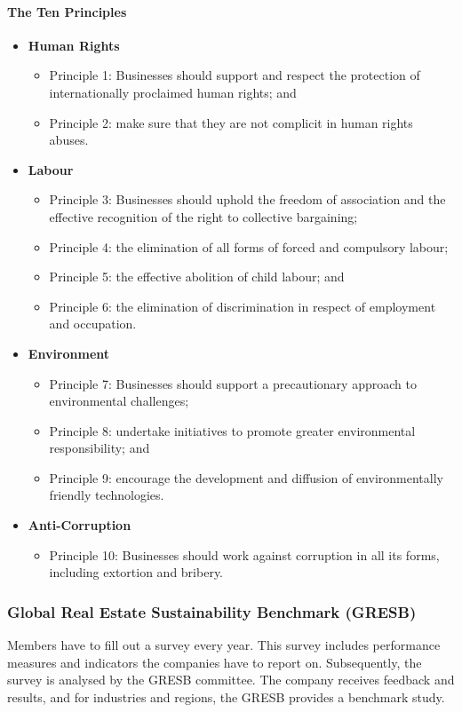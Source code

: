\documentclass[11pt]{article}
\theoremstyle{definition}
\begin{document}
\paragraph{The Ten Principles}
\begin{itemize}[leftmargin=*, label=, noitemsep]
	\item \textbf{Human Rights}
	\begin{itemize}[label=$\bullet$]
		\item Principle 1: Businesses should support and respect the protection of internationally proclaimed human rights; and
		\item Principle 2: make sure that they are not complicit in human rights abuses.
	\end{itemize}
	\item \textbf{Labour}
	\begin{itemize}[label=$\bullet$]
		\item Principle 3: Businesses should uphold the freedom of association and the effective recognition of the right to collective bargaining;
		\item Principle 4: the elimination of all forms of forced and compulsory labour;
		\item Principle 5: the effective abolition of child labour; and
		\item Principle 6: the elimination of discrimination in respect of employment and occupation.
	\end{itemize}
	\item \textbf{Environment}
	\begin{itemize}[label=$\bullet$]
		\item Principle 7: Businesses should support a precautionary approach to environmental challenges;
		\item Principle 8: undertake initiatives to promote greater environmental responsibility; and
		\item Principle 9: encourage the development and diffusion of environmentally friendly technologies.
	\end{itemize}
	\item \textbf{Anti-Corruption}
	\begin{itemize}[label=$\bullet$]
		\item Principle 10: Businesses should work against corruption in all its forms, including extortion and bribery.
	\end{itemize}
\end{itemize}

\subsubsection{Global Real Estate Sustainability Benchmark (GRESB)}
Members have to fill out a survey every year. This survey includes performance measures and indicators the companies have to report on. Subsequently, the survey is analysed by the GRESB committee. The company receives feedback and results, and for industries and regions, the GRESB provides a benchmark study.
\end{document}
